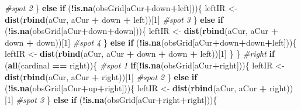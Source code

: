 \documentclass[]{article}
\newenvironment{Shaded}{\begin{snugshade}}{\end{snugshade}}
\newcommand{\CommentTok}[1]{\textcolor[rgb]{0.56,0.35,0.01}{\textit{#1}}}
\newcommand{\ControlFlowTok}[1]{\textcolor[rgb]{0.13,0.29,0.53}{\textbf{#1}}}
\newcommand{\DecValTok}[1]{\textcolor[rgb]{0.00,0.00,0.81}{#1}}
\newcommand{\KeywordTok}[1]{\textcolor[rgb]{0.13,0.29,0.53}{\textbf{#1}}}
\newcommand{\NormalTok}[1]{#1}
\newcommand{\OperatorTok}[1]{\textcolor[rgb]{0.81,0.36,0.00}{\textbf{#1}}}
\newcommand{\StringTok}[1]{\textcolor[rgb]{0.31,0.60,0.02}{#1}}
\begin{document}
\begin{Shaded}
\begin{Highlighting}[]
         \CommentTok{#spot 2}
\NormalTok{    \} }\ControlFlowTok{else} \ControlFlowTok{if}\NormalTok{ (}\OperatorTok{!}\KeywordTok{is.na}\NormalTok{(obsGrid[aCur}\OperatorTok{+}\NormalTok{down}\OperatorTok{+}\NormalTok{left]))\{}
\NormalTok{       leftIR <-}\StringTok{ }\KeywordTok{dist}\NormalTok{(}\KeywordTok{rbind}\NormalTok{(aCur, aCur }\OperatorTok{+}\StringTok{ }\NormalTok{down }\OperatorTok{+}\StringTok{ }\NormalTok{left))[}\DecValTok{1}\NormalTok{]}
       \CommentTok{#spot 3}
\NormalTok{    \} }\ControlFlowTok{else} \ControlFlowTok{if}\NormalTok{ (}\OperatorTok{!}\KeywordTok{is.na}\NormalTok{(obsGrid[aCur}\OperatorTok{+}\NormalTok{down}\OperatorTok{+}\NormalTok{down]))\{}
\NormalTok{    leftIR <-}\StringTok{ }\KeywordTok{dist}\NormalTok{(}\KeywordTok{rbind}\NormalTok{(aCur, aCur }\OperatorTok{+}\StringTok{ }\NormalTok{down }\OperatorTok{+}\StringTok{ }\NormalTok{down))[}\DecValTok{1}\NormalTok{]}
    \CommentTok{#spot 4}
\NormalTok{    \} }\ControlFlowTok{else} \ControlFlowTok{if}\NormalTok{ (}\OperatorTok{!}\KeywordTok{is.na}\NormalTok{(obsGrid[aCur}\OperatorTok{+}\NormalTok{down}\OperatorTok{+}\NormalTok{down}\OperatorTok{+}\NormalTok{left]))\{}
\NormalTok{      leftIR <-}\StringTok{ }\KeywordTok{dist}\NormalTok{(}\KeywordTok{rbind}\NormalTok{(aCur, aCur }\OperatorTok{+}\StringTok{ }\NormalTok{down }\OperatorTok{+}\StringTok{ }\NormalTok{down }\OperatorTok{+}\StringTok{ }\NormalTok{left))[}\DecValTok{1}\NormalTok{]}
\NormalTok{    \}}
\NormalTok{   \}}
  \CommentTok{#right}
  \ControlFlowTok{if}\NormalTok{ (}\KeywordTok{all}\NormalTok{(cardinal }\OperatorTok{==}\StringTok{ }\NormalTok{right))\{}
    \CommentTok{#spot 1}
    \ControlFlowTok{if}\NormalTok{(}\OperatorTok{!}\KeywordTok{is.na}\NormalTok{(obsGrid[aCur}\OperatorTok{+}\NormalTok{right]))\{}
\NormalTok{         leftIR <-}\StringTok{ }\KeywordTok{dist}\NormalTok{(}\KeywordTok{rbind}\NormalTok{(aCur, aCur }\OperatorTok{+}\StringTok{ }\NormalTok{right))[}\DecValTok{1}\NormalTok{]}
         \CommentTok{#spot 2}
\NormalTok{    \} }\ControlFlowTok{else} \ControlFlowTok{if}\NormalTok{ (}\OperatorTok{!}\KeywordTok{is.na}\NormalTok{(obsGrid[aCur}\OperatorTok{+}\NormalTok{up}\OperatorTok{+}\NormalTok{right]))\{}
\NormalTok{       leftIR <-}\StringTok{ }\KeywordTok{dist}\NormalTok{(}\KeywordTok{rbind}\NormalTok{(aCur, aCur }\OperatorTok{+}\StringTok{ }\NormalTok{right))[}\DecValTok{1}\NormalTok{]}
       \CommentTok{#spot 3}
\NormalTok{    \} }\ControlFlowTok{else} \ControlFlowTok{if}\NormalTok{ (}\OperatorTok{!}\KeywordTok{is.na}\NormalTok{(obsGrid[aCur}\OperatorTok{+}\NormalTok{right}\OperatorTok{+}\NormalTok{right]))\{}

\end{Highlighting}
\end{Shaded}
\end{document}
